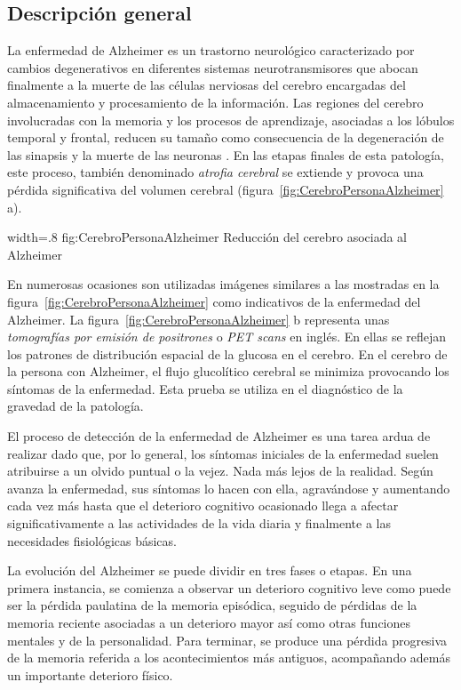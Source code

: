 \subsection{Descripción general}
La enfermedad de Alzheimer es un trastorno neurológico caracterizado por cambios degenerativos en diferentes sistemas neurotransmisores que abocan finalmente a la muerte de las células nerviosas del cerebro encargadas del almacenamiento y procesamiento de la información. Las regiones del cerebro involucradas con la memoria y los procesos de aprendizaje, asociadas a los lóbulos temporal y frontal, reducen su tamaño como consecuencia de la degeneración de las sinapsis y la muerte de las neuronas \citep{romano2007enfermedad,mattson2004pathways}. En las etapas finales de esta patología, este proceso, también denominado \textit{atrofia cerebral} se extiende y provoca una pérdida significativa del volumen cerebral (figura~\ref{fig:CerebroPersonaAlzheimer} a).


%
{width=.8\textwidth}%
{fig:CerebroPersonaAlzheimer}%
{Reducción del cerebro asociada al Alzheimer \citep{mattson2004pathways}}

En numerosas ocasiones son utilizadas imágenes similares a las mostradas en la figura~\ref{fig:CerebroPersonaAlzheimer} como indicativos de la enfermedad del Alzheimer. La figura~\ref{fig:CerebroPersonaAlzheimer} b  representa unas \textit{tomografías por emisión de positrones} o \textit{PET scans} en inglés. En ellas se reflejan los patrones de distribución espacial de la glucosa en el cerebro. En el cerebro de la persona con Alzheimer, el flujo glucolítico cerebral se minimiza provocando los síntomas de la enfermedad. Esta prueba se utiliza en el diagnóstico de la gravedad de la patología.


El proceso de detección de la enfermedad de Alzheimer es una tarea ardua de realizar dado que, por lo general, los síntomas iniciales de la enfermedad suelen atribuirse a un olvido puntual o la vejez. Nada más lejos de la realidad. Según avanza la enfermedad, sus síntomas lo hacen con ella, agravándose y aumentando cada vez más hasta que el deterioro cognitivo ocasionado llega a afectar significativamente a las actividades de la vida diaria y finalmente a las necesidades fisiológicas básicas.

La evolución del Alzheimer se puede dividir en tres fases o etapas. En una primera instancia, se comienza a observar un deterioro cognitivo leve como puede ser la pérdida paulatina de la memoria episódica, seguido de pérdidas de la memoria reciente asociadas a un deterioro mayor así como otras funciones mentales y de la personalidad. Para terminar, se produce una pérdida progresiva de la memoria referida a los acontecimientos más antiguos, acompañando además un importante deterioro físico.


